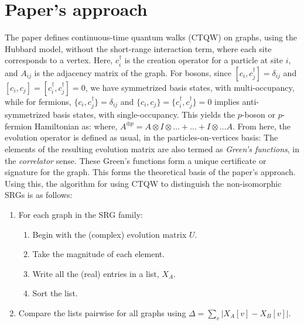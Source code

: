 \documentclass[twocolumn,a4paper,english,10pt]{article}
\begin{document}
\section{Paper's approach}
The paper defines continuous-time quantum walks (CTQW) on graphs, using the Hubbard model, 
without the short-range interaction term, where each site corresponds to a vertex.
Here, $c_i^\dagger$ is the creation operator for a particle at site $i$, and 
$A_{ij}$ is the adjacency matrix of the graph. For bosons, since 
$[c_i, c_j^\dagger] = \delta_{ij}$ and $[c_i, c_j] = [c_i^\dagger, c_j^\dagger] = 0$, 
we have symmetrized basis states, with multi-occupancy, while for fermions, 
$\{c_i, c_j^\dagger\} = \delta_{ij}$ and $\{c_i, c_j\} = \{c_i^\dagger, c_j^\dagger\} = 0$ 
implies anti-symmetrized basis states, with single-occupancy. This yields the $p$-boson or 
$p$-fermion Hamiltonian as:
where, $A^{\oplus p} = A\otimes I \otimes \dots + \dots + I \otimes \dots A$. From here, 
the evolution operator is defined as usual, in the particles-on-vertices basis:
The elements of the resulting evolution matrix are also termed as \textit{Green's functions}, in the 
\textit{correlator} sense. These Green's functions form a unique certificate or signature for the graph. 
This forms the theoretical basis of the paper's approach. Using this, the algorithm for using CTQW to distinguish the 
non-isomorphic SRGs is as follows:
\begin{enumerate}
    \item For each graph in the SRG family:
        \begin{enumerate}
            \item Begin with the (complex) evolution matrix $U$.
            \item Take the magnitude of each element.
            \item Write all the (real) entries in a list, $X_A$.
            \item Sort the list.
        \end{enumerate}
    \item Compare the lists pairwise for all graphs using $\Delta = \sum_v |X_A[v] - X_B[v]|$.
\end{enumerate}
\end{document}
